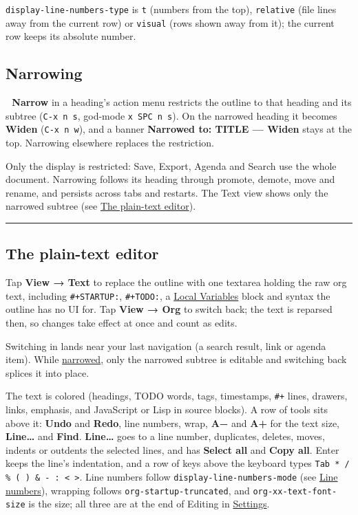 \documentclass[11pt]{article}
\begin{document}
\texttt{display-line-numbers-type} is \texttt{t} (numbers from the top), \texttt{relative} (file lines away from the current row) or \texttt{visual} (rows shown away from it); the current row keeps its absolute number.

\subsection{Narrowing}
\label{sec:org4bc1b50}
\textbf{🔽 Narrow} in a heading's action menu restricts the outline to that heading and its subtree (\texttt{C-x n s}, god-mode \texttt{x SPC n s}). On the narrowed heading it becomes \textbf{🔼 Widen} (\texttt{C-x n w}), and a banner \textbf{Narrowed to: TITLE — Widen} stays at the top. Narrowing elsewhere replaces the restriction.

Only the display is restricted: Save, Export, Agenda and Search use the whole document. Narrowing follows its heading through promote, demote, move and rename, and persists across tabs and restarts. The Text view shows only the narrowed subtree (see \hyperref[sec:org0afb086]{The plain-text editor}).

\noindent\rule{\textwidth}{0.5pt}

\subsection{The plain-text editor}
\label{sec:org0afb086}
Tap \textbf{View → Text} to replace the outline with one textarea holding the raw org text, including \texttt{\#+STARTUP:}, \texttt{\#+TODO:}, a \hyperref[sec:org761a631]{Local Variables} block and syntax the outline has no UI for. Tap \textbf{View → Org} to switch back; the text is reparsed then, so changes take effect at once and count as edits.

Switching in lands near your last navigation (a search result, link or agenda item). While \hyperref[sec:org4bc1b50]{narrowed}, only the narrowed subtree is editable and switching back splices it into place.

The text is colored (headings, TODO words, tags, timestamps, \texttt{\#+} lines, drawers, links, emphasis, and JavaScript or Lisp in source blocks). A row of tools sits above it: \textbf{Undo} and \textbf{Redo}, line numbers, wrap, \textbf{A−} and \textbf{A+} for the text size, \textbf{Line…} and \textbf{Find}. \textbf{Line…} goes to a line number, duplicates, deletes, moves, indents or outdents the selected lines, and has \textbf{Select all} and \textbf{Copy all}. Enter keeps the line's indentation, and a row of keys above the keyboard types \texttt{Tab * / \% ( ) \& - : < >}. Line numbers follow \texttt{display-line-numbers-mode} (see \hyperref[sec:org31dd5c0]{Line numbers}), wrapping follows \texttt{org-startup-truncated}, and \texttt{org-xx-text-font-size} is the size; all three are at the end of Editing in \hyperref[sec:org788d206]{Settings}.
\end{document}
